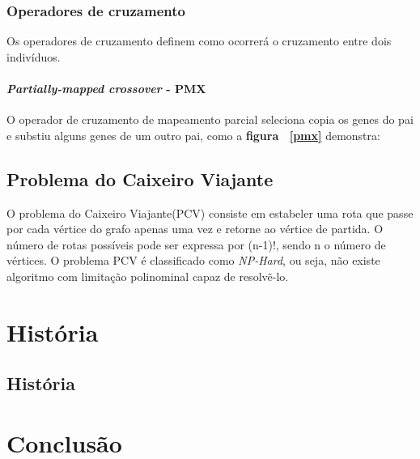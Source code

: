 \documentclass{abnt}
\begin{document}
		\subsection{Operadores de cruzamento}

			Os operadores de cruzamento definem como ocorrerá o cruzamento entre dois indivíduos.

		\subsubsection{\textit{Partially-mapped crossover} - PMX} 

			O operador de cruzamento de mapeamento parcial seleciona copia os genes do pai e substiu alguns genes de um outro pai, como a \textbf{figura ~\ref{pmx}} demonstra:


			


		\section{Problema do Caixeiro Viajante}

		O problema do Caixeiro Viajante(PCV) consiste em estabeler uma rota que passe por cada vértice do grafo apenas uma vez e retorne ao vértice de partida. O número de rotas possíveis pode ser expressa por (n-1)!, sendo n o número de vértices.
		O problema PCV é classificado como \textit{NP-Hard}, ou seja, não existe algoritmo com limitação polinominal capaz de resolvẽ-lo.\cite{0010-pdf}















	\chapter{História}
	\section{História}
	
	\chapter{Conclusão}
	
	
	\nocite{R7}
	\nocite{fisio}
	\nocite{olhar}
	
	
\end{document}
